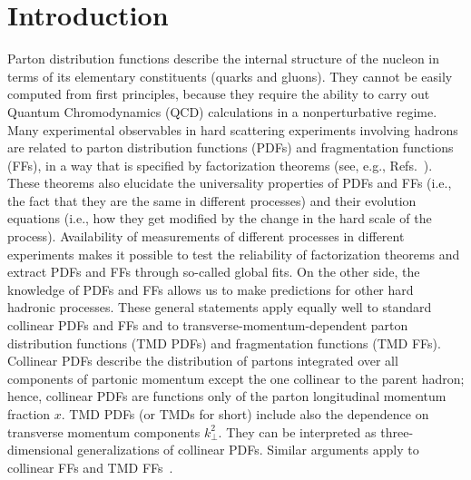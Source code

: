 \documentclass[aps,preprintnumbers,showpacs,nofootinbib,superscriptaddress,floatfix]{revtex4}
\newcommand{\T}{\perp}
\begin{document}

\maketitle
\tableofcontents

\newpage
\section{Introduction}
\label{s:intro}

Parton distribution functions describe the internal structure of the nucleon
in terms of its elementary constituents (quarks and gluons). They cannot be
easily computed from first principles, because they require the ability to
carry out Quantum Chromodynamics (QCD) calculations in a nonperturbative
regime. Many experimental observables in hard scattering experiments
involving hadrons are related to parton distribution functions (PDFs) and
fragmentation functions (FFs), in a way that is specified by factorization
theorems (see, e.g., Refs.~\cite{Collins:1989gx,Collins:2011zzd}). 
These theorems also elucidate the universality properties of PDFs and FFs
(i.e., the fact that they are the same in different processes) 
and their evolution equations (i.e., how they get modified by the change in
the hard scale of the process). 
Availability of measurements of different processes in different
experiments makes it possible to test the reliability of factorization
theorems and extract PDFs and FFs through so-called global fits. 
On the other side, the knowledge of PDFs and FFs allows us
to make predictions for other hard hadronic processes. 
These general statements apply equally well to
standard collinear PDFs and FFs and to transverse-momentum-dependent parton
distribution functions (TMD PDFs) and fragmentation functions (TMD FFs). 
Collinear PDFs
describe the distribution of partons integrated over all components of
partonic momentum except the one collinear to the parent hadron; hence,
collinear PDFs
are functions only of the parton longitudinal momentum fraction $x$. 
TMD PDFs (or TMDs for short) 
include also the dependence on transverse momentum components $k_{\T}^2$. 
They can be interpreted as three-dimensional generalizations of collinear PDFs.
Similar arguments apply to collinear FFs and TMD FFs~\cite{Angeles-Martinez:2015sea}.
\end{document}
